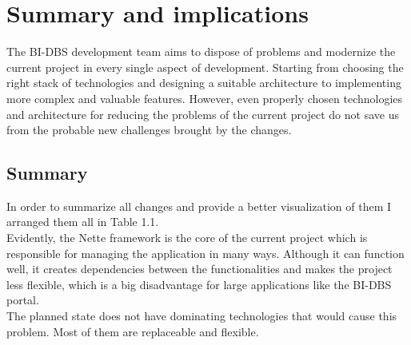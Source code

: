 \section{Summary and implications} The BI-DBS development team aims to dispose of problems and modernize the current project in every single aspect of development. Starting from choosing the right stack of technologies and designing a suitable architecture to implementing more complex and valuable features. However, even properly chosen technologies and architecture for reducing the problems of the current project do not save us from the probable new challenges brought by the changes. 


\subsection{Summary} 
In order to summarize all changes and provide a better visualization of them I arranged them all in Table 1.1.\\
Evidently, the Nette framework is the core of the current project which is responsible for managing the application in many ways. Although it can function well, it creates dependencies between the functionalities and makes the project less flexible, which is a big disadvantage for large applications like the BI-DBS portal.\\
The planned state does not have dominating technologies that would cause this problem. Most of them are replaceable and flexible.



